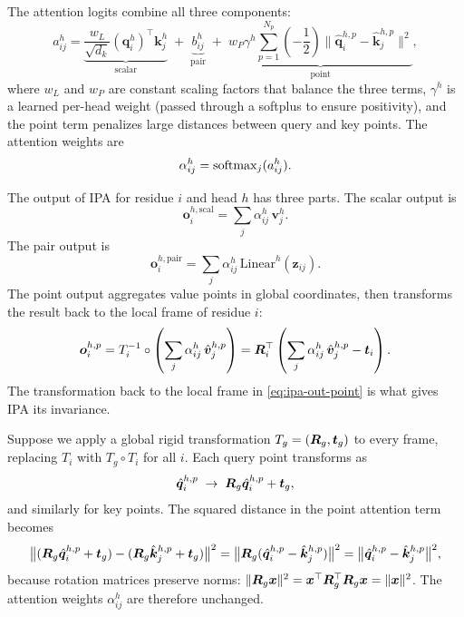 The attention logits combine all three components:
\begin{equation}
\label{eq:ipa-logits}
a_{ij}^h = \underbrace{\frac{w_L}{\sqrt{d_k}} (\bm{q}_i^h)^\top \bm{k}_j^h}_{\text{scalar}} \;+\; \underbrace{b_{ij}^h}_{\text{pair}} \;+\; \underbrace{w_P \gamma^h \sum_{p=1}^{N_p} \!\left(-\frac{1}{2}\right) \bigl\|\hat{\bm{q}}_i^{h,p} - \hat{\bm{k}}_j^{h,p}\bigr\|^2}_{\text{point}},
\end{equation}
where $w_L$ and $w_P$ are constant scaling factors that balance the three terms, $\gamma^h$ is a learned per-head weight (passed through a softplus to ensure positivity), and the point term penalizes large distances between query and key points.
The attention weights are
\begin{equation}
\label{eq:ipa-weights}
\alpha_{ij}^h = \operatorname{softmax}_j(a_{ij}^h).
\end{equation}

The output of IPA for residue $i$ and head $h$ has three parts.  The scalar output is
\begin{equation}
\label{eq:ipa-out-scalar}
\bm{o}_i^{h,\text{scal}} = \sum_j \alpha_{ij}^h \,\bm{v}_j^h.
\end{equation}
The pair output is
\begin{equation}
\label{eq:ipa-out-pair}
\bm{o}_i^{h,\text{pair}} = \sum_j \alpha_{ij}^h \,\text{Linear}^h(\bm{z}_{ij}).
\end{equation}
The point output aggregates value points in global coordinates, then transforms the result back to the local frame of residue $i$:
\begin{equation}
\label{eq:ipa-out-point}
\bm{o}_i^{h,p} = T_i^{-1} \circ \left(\sum_j \alpha_{ij}^h \,\hat{\bm{v}}_j^{h,p}\right) = \bm{R}_i^\top \left(\sum_j \alpha_{ij}^h \,\hat{\bm{v}}_j^{h,p} - \bm{t}_i\right).
\end{equation}
The transformation back to the local frame in \cref{eq:ipa-out-point} is what gives IPA its invariance.

Suppose we apply a global rigid transformation $T_g = (\bm{R}_g, \bm{t}_g)$ to every frame, replacing $T_i$ with $T_g \circ T_i$ for all $i$.
Each query point transforms as
\begin{equation}
\label{eq:ipa-invariance-q}
\hat{\bm{q}}_i^{h,p} \;\to\; \bm{R}_g \hat{\bm{q}}_i^{h,p} + \bm{t}_g,
\end{equation}
and similarly for key points.
The squared distance in the point attention term becomes
\begin{equation}
\label{eq:ipa-invariance-dist}
\bigl\|(\bm{R}_g \hat{\bm{q}}_i^{h,p} + \bm{t}_g) - (\bm{R}_g \hat{\bm{k}}_j^{h,p} + \bm{t}_g)\bigr\|^2
= \bigl\|\bm{R}_g (\hat{\bm{q}}_i^{h,p} - \hat{\bm{k}}_j^{h,p})\bigr\|^2
= \bigl\|\hat{\bm{q}}_i^{h,p} - \hat{\bm{k}}_j^{h,p}\bigr\|^2,
\end{equation}
because rotation matrices preserve norms: $\|\bm{R}_g \bm{x}\|^2 = \bm{x}^\top \bm{R}_g^\top \bm{R}_g \bm{x} = \|\bm{x}\|^2$.
The attention weights $\alpha_{ij}^h$ are therefore unchanged.

